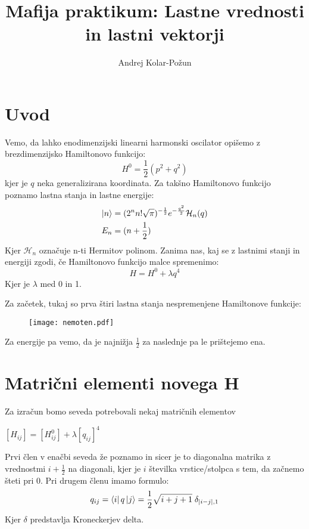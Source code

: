\documentclass{article}
\title{Mafija praktikum: Lastne vrednosti in lastni vektorji}
\author{Andrej Kolar-Po{\v z}un}
\begin{document}
\maketitle
\newpage
{}

\section{Uvod}
Vemo, da lahko enodimenzijski linearni harmonski oscilator opišemo z brezdimenzijsko Hamiltonovo funkcijo:
\begin{equation*}
H^0 = \frac{1}{2}(p^2 + q^2)
\end{equation*}
kjer je $q$ neka generalizirana koordinata.
Za takšno Hamiltonovo funkcijo poznamo lastna stanja in lastne energije:
\begin{align*}
\ket{n} &= (2^nn!\sqrt{\pi})^{-\frac{1}{2}}e^{-\frac{q^2}{2}}\mathcal{H}_n(q) \\
E_n &= (n+\frac{1}{2})
\end{align*}
Kjer $\mathcal{H}_n$ označuje n-ti Hermitov polinom.
Zanima nas, kaj se z lastnimi stanji in energiji zgodi, če Hamiltonovo funkcijo malce spremenimo:
\begin{equation*}
H = H^0 + \lambda q^4
\end{equation*}
Kjer je $\lambda$ med 0 in 1.

Za začetek, tukaj so prva štiri lastna stanja nespremenjene Hamiltonove funkcije:

\begin{figure}[H]
\texttt{[image: nemoten.pdf]}
\end{figure}
Za energije pa vemo, da je najnižja $\frac{1}{2}$ za naslednje pa le prištejemo ena.
\newpage
\section{Matrični elementi novega H}
Za izračun bomo seveda potrebovali nekaj matričnih elementov 

$[H_{ij}] = [H^0_{ij}] + \lambda [q_{ij}]^4$

Prvi člen v enačbi seveda že poznamo in sicer je to diagonalna matrika z vrednostmi $i+\frac{1}{2}$ na diagonali, kjer je $i$ številka vrstice/stolpca s tem, da začnemo šteti pri 0.
Pri drugem členu imamo formulo:
\begin{equation*}
q_{ij} = \bra{i}q\ket{ j} = \frac{1}{2} \sqrt{i+j+1}\; \delta_{|i-j|,1}
\end{equation*}
Kjer $\delta$ predstavlja Kroneckerjev delta.
\end{document}
